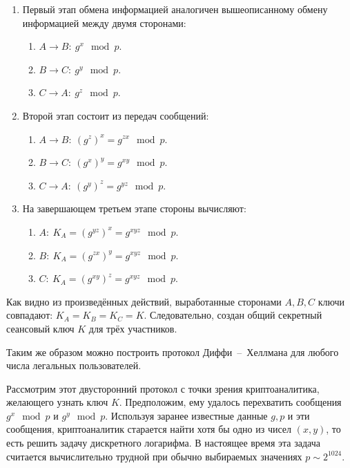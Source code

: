 \begin{enumerate}
    \item Первый этап обмена информацией аналогичен вышеописанному обмену информацией между двумя сторонами:
        \begin{enumerate}
            \item $A \rightarrow B: ~ g^x \mod p$.
            \item $B \rightarrow C: ~ g^y \mod p$.
            \item $C \rightarrow A: ~ g^z \mod p$.
        \end{enumerate}
    \item Второй этап состоит из передач сообщений:
        \begin{enumerate}
            \item $A \rightarrow B: ~ (g^z)^x = g^{zx} \mod p$.
            \item $B \rightarrow C: ~ (g^x)^y = g^{xy} \mod p$.
            \item $C \rightarrow A: ~ (g^y)^z = g^{yz} \mod p$.
        \end{enumerate}
    \item На завершающем третьем этапе стороны вычисляют:
        \begin{enumerate}
            \item $A: ~ K_A = (g^{yz})^x = g^{xyz} \mod p$.
            \item $B: ~ K_A = (g^{zx})^y = g^{xyz} \mod p$.
            \item $C: ~ K_A = (g^{xy})^z = g^{xyz} \mod p$.
        \end{enumerate}
\end{enumerate}

Как видно из произведённых действий, выработанные сторонами $A, B, C$ ключи совпадают: $K_A = K_B = K_C = K$. Следовательно, создан общий секретный сеансовый ключ $K$ для трёх участников.

Таким же образом можно построить протокол Диффи~--~Хеллмана для любого числа легальных пользователей.

Рассмотрим этот двусторонний протокол с точки зрения криптоаналитика, желающего узнать ключ $K$. Предположим, ему удалось перехватить сообщения $g^{x}\mod p$ и $g^{y}\mod p $. Используя заранее известные данные $g,p $ и эти сообщения, криптоаналитик старается найти хотя бы одно из чисел $(x,y)$, то есть решить задачу дискретного логарифма. В настоящее время эта задача считается вычислительно трудной при обычно выбираемых значениях $p\sim 2^{1024}$.

